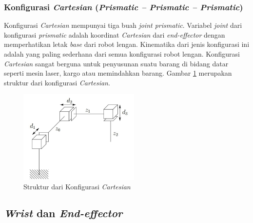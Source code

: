 \subsubsection{Konfigurasi \textit{Cartesian} (\textit{Prismatic – Prismatic – Prismatic})  } 

Konfigurasi \textit{Cartesian} mempunyai tiga buah \textit{joint prismatic}. Variabel \textit{joint} dari konfigurasi \textit{prismatic} adalah koordinat \textit{Cartesian} dari \textit{end-effector} dengan memperhatikan letak \textit{base} dari robot lengan. Kinematika dari jenis konfigurasi ini adalah yang paling sederhana dari semua konfigurasi robot lengan. Konfigurasi \textit{Cartesian} sangat berguna untuk penyusunan suatu barang di bidang datar seperti mesin laser, kargo atau memindahkan barang. Gambar \ref{pic.cartesian} merupakan struktur dari konfigurasi \textit{Cartesian}.

	\begin{figure}[H]
	\centering
	\includegraphics[width=6cm]{gambar/cartesian.jpg}
	\caption{Struktur dari Konfigurasi \textit{Cartesian}}
	\label{pic.cartesian}
\end{figure}

\subsection{ \textit{Wrist} dan \textit{End-effector} }

